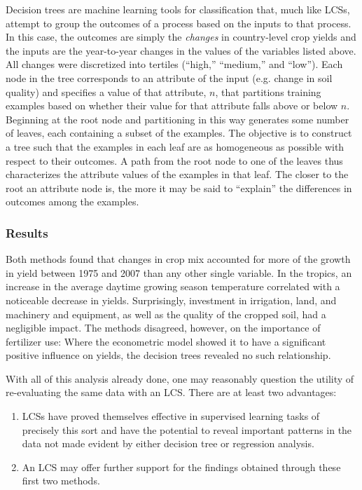 \documentclass[12pt,twoside]{article}
\begin{document}
Decision trees are machine learning tools for classification that, much like LCSs, attempt to group the outcomes of a process based on the inputs to that process. In this case, the outcomes are simply the \emph{changes} in country-level crop yields and the inputs are the year-to-year changes in the values of the variables listed above. All changes were discretized into tertiles (``high,'' ``medium,'' and ``low''). Each node in the tree corresponds to an attribute of the input (e.g. change in soil quality) and specifies a value  of that attribute, $n$, that partitions training examples based on whether their value for that attribute falls above or below $n$. Beginning at the root node and partitioning in this way generates some number of leaves, each containing a subset of the examples. The objective is to construct a tree such that the examples in each leaf are as homogeneous as possible with respect to their outcomes. A path from the root node to one of the leaves thus characterizes the attribute values of the examples in that leaf. The closer to the root an attribute node is, the more it may be said to ``explain'' the differences in outcomes among the examples.

\subsubsection{Results}
Both methods found that changes in crop mix accounted for more of the growth in yield between 1975 and 2007 than any other single variable. In the tropics, an increase in the average daytime growing season temperature correlated with a noticeable decrease in yields. Surprisingly, investment in irrigation, land, and machinery and equipment, as well as the quality of the cropped soil, had a negligible impact. The methods disagreed, however, on the importance of fertilizer use: Where the econometric model showed it to have a significant positive influence on yields, the decision trees revealed no such relationship.

With all of this analysis already done, one may reasonably question the utility of re-evaluating the same data with an LCS. There are at least two advantages:

\begin{enumerate}
\item LCSs have proved themselves effective in supervised learning tasks of precisely this sort and have the potential to reveal important patterns in the data not made evident by either decision tree or regression analysis.
\item An LCS may offer further support for the findings obtained through these first two methods.
\end{enumerate}
\end{document}
